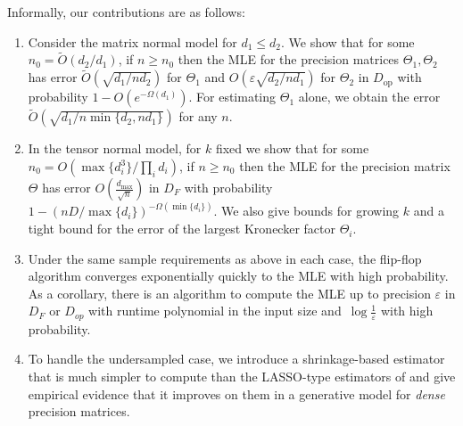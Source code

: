 \documentclass[aos]{imsart}
\theoremstyle{definition}
\numberwithin{equation}{section}
\DeclareMathOperator{\op}{op}
\newcommand{\eps}{\varepsilon}
\def\dmax{d_{\max}}
\newcommand{\CF}[1]{{\color{purple}[CF: #1]}}
\newcommand{\MW}[1]{{\color{red}[MW: #1]}}
\begin{document}
Informally, our contributions are as follows:
\begin{enumerate}
\item Consider the matrix normal model for $d_1 \leq d_2$. We show that for some $n_0 =\widetilde{O}( d_2/d_1)$, if $n \geq n_0$ then the MLE for the precision matrices $\Theta_1, \Theta_2$ has error $\widetilde{O}(\sqrt{{d_1}/{nd_2}})$ for $\Theta_1$ and $O(\eps \sqrt{{d_2}/{nd_1}})$ for $\Theta_2$ in $D_{\op}$ with probability $1 - O(e^{ - \Omega ( d_1)})$. For estimating $\Theta_1$ alone, we obtain the error $\widetilde{O}(\sqrt{{d_1}/{n\min\{d_2, n d_1\}}})$ for any $n$.
\item In the tensor normal model, for $k$ fixed we show that for some $n_0 = O( \max\{d_i^3\}/ \prod_i d_i)$, if $n \geq n_0$ then the MLE for the precision matrix $\Theta$ has error $O( \frac{\dmax}{\sqrt{n}} )$ in $D_F$ with probability $1 - (n D /\max\{d_i\})^{-\Omega(\min\{d_i\})}$. We also give bounds for growing $k$ and a tight bound for the error of the largest Kronecker factor $\Theta_i$.
\item Under the same sample requirements as above in each case, the flip-flop algorithm converges exponentially quickly to the MLE with high probability.
As a corollary, there is an algorithm to compute the MLE up to precision $\eps$ in $D_F$ or $D_{op}$ with runtime polynomial in the input size and~$\log\frac1\eps$ with high probability.
\item To handle the undersampled case, we introduce a shrinkage-based estimator that is much simpler to compute than the LASSO-type estimators of \cite{tsiligkaridis2013convergence,sun2015nonconvex,zhou2014gemini} and give empirical evidence that it improves on them in a generative model for \emph{dense} precision matrices. 
\end{enumerate}
\end{document}
